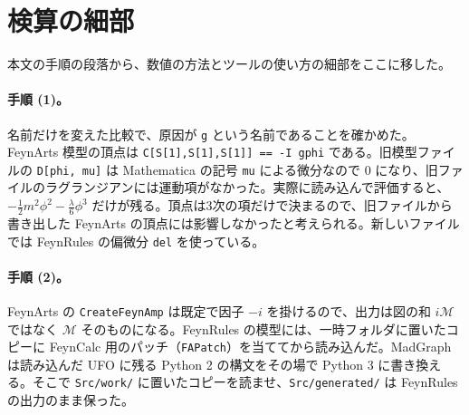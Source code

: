 \documentclass[a4paper,10pt]{ltjsarticle}
\begin{document}
\section{検算の細部}\label{app:details}

本文の手順の段落から、数値の方法とツールの使い方の細部をここに移した。

\paragraph{手順 (1)。}名前だけを変えた比較で、原因が \texttt{g} という名前であることを確かめた。FeynArts 模型の頂点は \texttt{C[S[1],S[1],S[1]] == -I gphi} である。旧模型ファイルの \texttt{D[phi, mu]} は Mathematica の記号 \texttt{mu} による微分なので 0 になり、旧ファイルのラグランジアンには運動項がなかった。実際に読み込んで評価すると、$-\frac12m^2\phi^2-\frac{\lambda}{6}\phi^3$ だけが残る。頂点は3次の項だけで決まるので、旧ファイルから書き出した FeynArts の頂点には影響しなかったと考えられる。新しいファイルでは FeynRules の偏微分 \texttt{del} を使っている。

\paragraph{手順 (2)。}FeynArts の \texttt{CreateFeynAmp} は既定で因子 $-i$ を掛けるので、出力は図の和 $i\mathcal{M}$ ではなく $\mathcal{M}$ そのものになる。FeynRules の模型には、一時フォルダに置いたコピーに FeynCalc 用のパッチ（\texttt{FAPatch}）を当ててから読み込んだ。MadGraph は読み込んだ UFO に残る Python 2 の構文をその場で Python 3 に書き換える。そこで \texttt{Src/work/} に置いたコピーを読ませ、\texttt{Src/generated/} は FeynRules の出力のまま保った。
\end{document}
